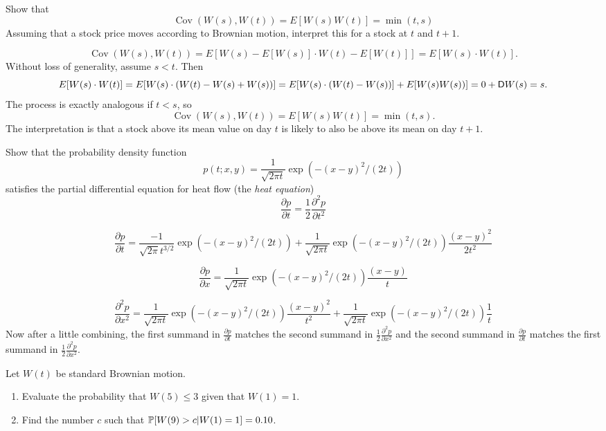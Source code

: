 \begin{solution}
\begin{solution}
\begin{solution}
\begin{solution}
\begin{solution}
\begin{solution}
\begin{solution}
\begin{solution}
\begin{solution}
\begin{solution}
{\begin{problem}
 Show that
   \[
      \operatorname{Cov}(W(s),W(t)) = E[W(s) W(t)] = \min(t,s)
   \]
  Assuming that a stock price moves according to Brownian motion,
  interpret this for a stock at $ t $ and $ t+1 $. 
\end{problem} 
\begin{solution} 

\[
   \operatorname{Cov}(W(s),W(t)) = E[W(s) - E[W(s)] \cdot W(t) -
   E[W(t)]] = E[W(s) \cdot W(t)].
\]
Without loss of generality, assume $s < t$.  Then
\[
   E[W(s) \cdot W(t)] = E[ W(s) \cdot ( W(t) - W(s) + W(s))]
   = E[ W(s) \cdot ( W(t) - W(s)) ] + E[ W(s) W(s))] = 0 +
   \D W(s) = s.
\]
The process is exactly analogous if $t < s$, so 
\[
   \operatorname{Cov}(W(s),W(t)) = E[W(s) W(t)] = \min(t,s).
\]
The interpretation is that a stock above its mean value on day $
t $ is likely to also be above its mean on day $ t + 1 $. 
\end{solution}

\begin{problem}
  Show that the probability density function
  \[
      p(t;x,y) = \frac{1}{\sqrt{2\pi t}} \exp( -(x-y)^2/(2t) )
  \]
  satisfies the partial differential equation for heat flow (the
  \emph{heat equation})
  \[
     \frac{\partial p}{\partial t} = \frac{1}{2} \frac{\partial^2
     p}{\partial t^2}
  \]

\end{problem} 
\begin{solution} 
\[
   \frac{\partial p}{\partial t} 
    = \frac{-1}{\sqrt{2\pi}  t^{3/2} } \exp( -(x-y)^2/(2t) ) 
    + \frac{1}{\sqrt{2\pi t}} \exp( -(x-y)^2/(2t) ) \frac{ (x-y)^2}{2 t^2}
\]

\[
   \frac{\partial p}{\partial x} 
    = \frac{1}{\sqrt{2\pi t}} \exp( -(x-y)^2/(2t) ) \frac{ (x-y)}{t}
\]

\[
   \frac{\partial^2 p}{\partial x^2} 
    = \frac{1}{\sqrt{2\pi t}} \exp( -(x-y)^2/(2t) ) \frac{
   (x-y)^2}{t^2}
   + \frac{1}{\sqrt{2\pi t}} \exp( -(x-y)^2/(2t) ) \frac{1}{t}  
\]
Now after a little combining, 
the first summand in  $ \frac{\partial p}{\partial t} $ matches
the second summand in $ \frac{1}{2}  \frac{\partial^2 p}{\partial x^2}$ 
and the second summand in  $ \frac{\partial p}{\partial t} $ matches
the first summand in $ \frac{1}{2}  \frac{\partial^2 p}{\partial x^2}$.
\end{solution}

\begin{problem}
 Let $ W(t) $ be standard Brownian motion.
  \begin{enumerate}
      \item
          Evaluate the probability that $ W(5) \le 3 $ given that $
          W(1) = 1 $.
      \item
          Find the number $ c $ such that $ \P[ W(9) > c | W(1)
          =1 ] = 0.10 $.
  \end{enumerate}


\end{problem}}
\end{solution}
\end{solution}
\end{solution}
\end{solution}
\end{solution}
\end{solution}
\end{solution}
\end{solution}
\end{solution}
\end{solution}

